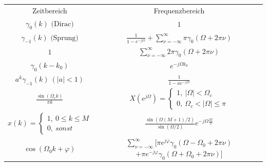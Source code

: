 \documentclass[10pt,a4paper]{article}
\begin{document}
\begin{center}
  \bgroup
  \def\arraystretch{1.5}
  \begin{tabular}{ | c | c | }
  \cline{1-2}
          \rowcolor{black!15}
          Zeitbereich & Frequenzbereich \\
  
  \cline{1-2}
          $\gamma_0(k) \text{ (Dirac)}$ & $1$ \\

  \cline{1-2}
          $\gamma_{-1}(k) \text{ (Sprung)}$ & $\frac{1}{1-e^{-j\Omega}}+\displaystyle\sum\limits_{\nu=-\infty}^{\infty}\pi\gamma_0(\Omega+2\pi\nu)$\\

  \cline{1-2}
          $1$ & $\displaystyle\sum\limits_{\nu=-\infty}^{\infty}2\pi\gamma_0(\Omega+2\pi\nu)$ \\  

  \cline{1-2}
          $\gamma_0(k-k_0)$ & $e^{-j\Omega{}k_0}$ \\  

  \cline{1-2}
          $a^{k}\gamma_{-1}(k)\:(|a|<1)$ & $\frac{1}{1-ae^{-j\Omega}}$\\ 

  \cline{1-2}
          $\frac{\sin(\Omega_{c}k)}{\pi{}k}$& $X(e^{j\Omega}) =
          \begin{cases}
              1,\:|\Omega|<\Omega_c \\
              0,\:\Omega_c < |\Omega| \leq \pi
          \end{cases}
          $\\ 
  
  \cline{1-2}
          $x(k)=
          \begin{cases}
            1,\:0\leq{}k\leq{}M \\
            0,\:sonst
          \end{cases}$ & $\frac{\sin(\Omega(M+1)/2)}{\sin(\Omega/2)}e^{-j\Omega{}\frac{M}{2}}$ \\  
  
  \cline{1-2}
          $\cos(\Omega_{0}k+\varphi)$ & \shortstack{$\displaystyle\sum\limits_{\nu=-\infty}^{\infty} [\pi{}e^{j\varphi}\gamma_0(\Omega-\Omega_0+2\pi\nu)$ \\ $+\pi{}e^{-j\varphi}\gamma_0(\Omega+\Omega_0+2\pi\nu)]$} \\
  \cline{1-2}
  \end{tabular}
  \egroup
\end{center}
\end{document}
